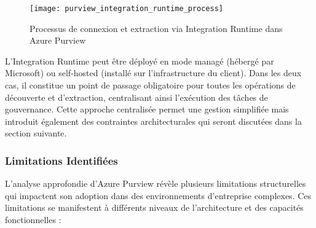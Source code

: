 \begin{figure}[htpb]
\centering
\texttt{[image: purview\_integration\_runtime\_process]}
\caption{Processus de connexion et extraction via Integration Runtime dans Azure Purview}
\label{fig:purview_ir_process}
\end{figure}

L'Integration Runtime peut être déployé en mode managé (hébergé par Microsoft) ou self-hosted (installé sur l'infrastructure du client). Dans les deux cas, il constitue un point de passage obligatoire pour toutes les opérations de découverte et d'extraction, centralisant ainsi l'exécution des tâches de gouvernance. Cette approche centralisée permet une gestion simplifiée mais introduit également des contraintes architecturales qui seront discutées dans la section suivante.

\subsubsection{Limitations Identifiées}

L'analyse approfondie d'Azure Purview révèle plusieurs limitations structurelles qui impactent son adoption dans des environnements d'entreprise complexes. Ces limitations se manifestent à différents niveaux de l'architecture et des capacités fonctionnelles :

